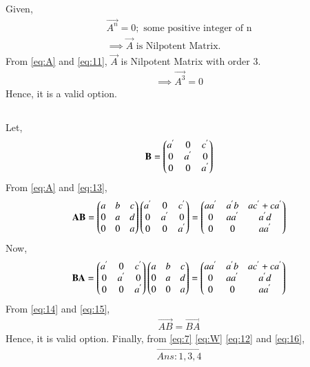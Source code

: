 \documentclass[journal,12pt,twocolumn]{IEEEtran}
\begin{document}
\subsection{}
Given, 
\begin{align}
\vec{A^n}=0; \mbox { some positive integer of n}\\ \implies \vec{A} \mbox{ is Nilpotent Matrix.} \label{eq:11}
\end{align}
From \eqref{eq:A} and \eqref{eq:11}, \newline
  $\vec{A}$ is Nilpotent Matrix with order 3. 
\begin{align}
\boxed{\implies\vec{A^3}=0}  \label{eq:12}
\end{align}
Hence, it is a valid option.
\subsection{}
Let,
\begin{align}
\mathbf{B}=\begin{pmatrix}a^{'} & 0 & c^{'}\\ 0 & a^{'} & 0 \\ 0 & 0 & a^{'}\end{pmatrix}  \label{eq:13}
\end{align}
From \eqref{eq:A} and \eqref{eq:13},
\begin{align}
\mathbf{AB}=\begin{pmatrix}a & b & c\\ 0 & a & d \\ 0 & 0 & a\end{pmatrix}\begin{pmatrix}a^{'} & 0 & c^{'}\\ 0 & a^{'} & 0 \\ 0 & 0 & a^{'}\end{pmatrix}=\begin{pmatrix}a a^{'} & a^{'}b & ac^{'}+ca^{'}\\ 0 & a a^{'} & a^{'}d \\ 0 & 0 & a a^{'}\end{pmatrix}  \label{eq:14}
\end{align}
Now,
\begin{align}
\mathbf{BA}=\begin{pmatrix}a^{'} & 0 & c^{'}\\ 0 & a^{'} & 0 \\ 0 & 0 & a^{'}\end{pmatrix}\begin{pmatrix}a & b & c\\ 0 & a & d \\ 0 & 0 & a\end{pmatrix}=\begin{pmatrix}a a^{'} & a^{'}b & ac^{'}+ca^{'}\\ 0 & a a^{'} & a^{'}d \\ 0 & 0 & a a^{'}\end{pmatrix}  \label{eq:15}
\end{align}
From \eqref{eq:14} and \eqref{eq:15},
\begin{align}
\boxed{\vec{AB}=\vec{BA}}  \label{eq:16}
\end{align}
Hence, it is valid option. \newline \newline
Finally, from \eqref{eq:7} \eqref{eq:W} \eqref{eq:12} and \eqref{eq:16},
\begin{align}
\boxed{\vec{Ans: 1,3,4}}
\end{align}
\end{document}
